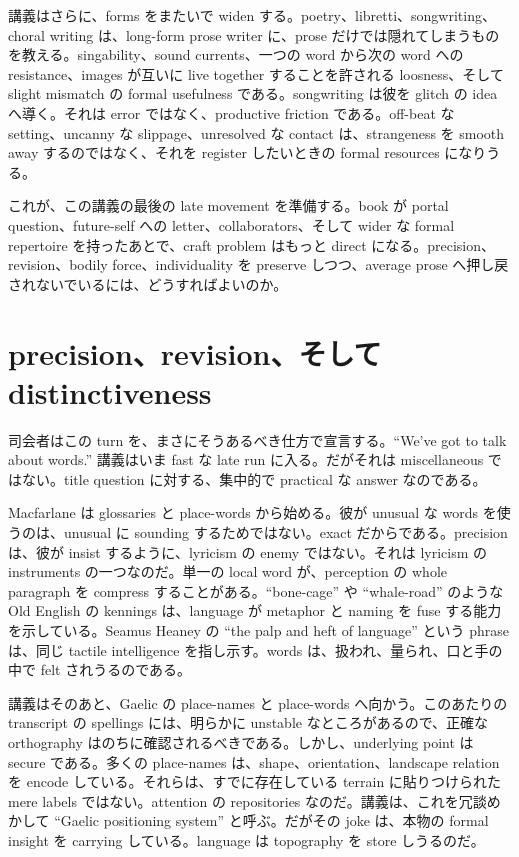講義はさらに、forms をまたいで widen する。poetry、libretti、songwriting、choral writing は、long-form prose writer に、prose だけでは隠れてしまうものを教える。singability、sound currents、一つの word から次の word への resistance、images が互いに live together することを許される loosness、そして slight mismatch の formal usefulness である。songwriting は彼を glitch の idea へ導く。それは error ではなく、productive friction である。off-beat な setting、uncanny な slippage、unresolved な contact は、strangeness を smooth away するのではなく、それを register したいときの formal resources になりうる。

これが、この講義の最後の late movement を準備する。book が portal question、future-self への letter、collaborators、そして wider な formal repertoire を持ったあとで、craft problem はもっと direct になる。precision、revision、bodily force、individuality を preserve しつつ、average prose へ押し戻されないでいるには、どうすればよいのか。

\section{precision、revision、そして distinctiveness}

司会者はこの turn を、まさにそうあるべき仕方で宣言する。``We've got to talk about words.'' 講義はいま fast な late run に入る。だがそれは miscellaneous ではない。title question に対する、集中的で practical な answer なのである。

Macfarlane は glossaries と place-words から始める。彼が unusual な words を使うのは、unusual に sounding するためではない。exact だからである。precision は、彼が insist するように、lyricism の enemy ではない。それは lyricism の instruments の一つなのだ。単一の local word が、perception の whole paragraph を compress することがある。``bone-cage'' や ``whale-road'' のような Old English の kennings は、language が metaphor と naming を fuse する能力を示している。Seamus Heaney の ``the palp and heft of language'' という phrase は、同じ tactile intelligence を指し示す。words は、扱われ、量られ、口と手の中で felt されうるのである。

講義はそのあと、Gaelic の place-names と place-words へ向かう。このあたりの transcript の spellings には、明らかに unstable なところがあるので、正確な orthography はのちに確認されるべきである。しかし、underlying point は secure である。多くの place-names は、shape、orientation、landscape relation を encode している。それらは、すでに存在している terrain に貼りつけられた mere labels ではない。attention の repositories なのだ。講義は、これを冗談めかして ``Gaelic positioning system'' と呼ぶ。だがその joke は、本物の formal insight を carrying している。language は topography を store しうるのだ。

